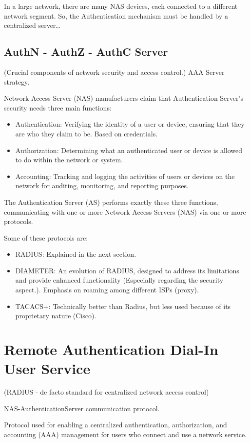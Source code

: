 \begin{tcolorbox}[colback=red!10!white, colframe=red!70!black, coltitle=white, title=Beware]
In a large network, there are many NAS devices, each connected to a different network segment. So, the Authentication mechanism must be handled by a centralized server\dots
\end{tcolorbox}
\subsection{AuthN - AuthZ - AuthC Server}
\begin{center}
    (Crucial components of network security and access control.) \newline
    AAA Server strategy.
\end{center}

Network Access Server (NAS) manufacturers claim that Authentication Server's security needs three main functions:
\begin{itemize}
    \item Authentication: Verifying the identity of a user or device, ensuring that they are who they claim to be. Based on credentials.
    \item Authorization: Determining what an authenticated user or device is allowed to do within the network or system.
    \item Accounting: Tracking and logging the activities of users or devices on the network for auditing, monitoring, and reporting purposes.
\end{itemize}
The Authentication Server (AS) performs exactly these three functions, communicating with one or more Network Access Servers (NAS) via one or more protocols. 

Some of these protocols are:
\begin{itemize}
    \item RADIUS: Explained in the next section.
    \item DIAMETER: An evolution of RADIUS, designed to address its limitations and provide enhanced functionality (Especially regarding the security aspect.). Emphasis on roaming among different ISPs (proxy).
    \item TACACS+: Technically better than Radius, but less used because of its proprietary nature (Cisco).
\end{itemize}

\clearpage

\section{Remote Authentication Dial-In User Service}
\begin{center}
    (RADIUS - de facto standard for centralized network access control)

    NAS-AuthenticationServer communication protocol.
\end{center}
Protocol used for enabling a centralized authentication, authorization, and accounting (AAA) management for users who connect and use a network service.

